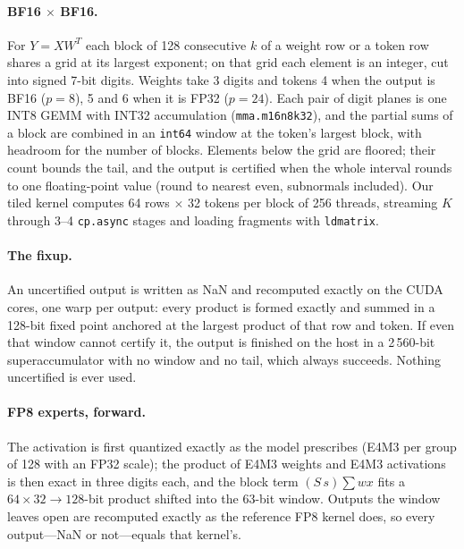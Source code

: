 \documentclass[11pt]{article}
\begin{document}
\paragraph{BF16 $\times$ BF16.} For $Y=XW^{T}$ each block of 128 consecutive $k$ of a weight row or a token row shares a grid at
its largest exponent; on that grid each element is an integer, cut into signed 7-bit digits. Weights take 3 digits and tokens 4
when the output is BF16 ($p=8$), 5 and 6 when it is FP32 ($p=24$). Each pair of digit planes is one INT8 GEMM with INT32
accumulation (\texttt{mma.m16n8k32}), and the partial sums of a block are combined in an \texttt{int64} window at the token's
largest block, with headroom for the number of blocks. Elements below the grid are floored; their count bounds the tail, and
the output is certified when the whole interval rounds to one floating-point value (round to nearest even, subnormals
included). Our tiled kernel computes 64 rows $\times$ 32 tokens per block of 256 threads, streaming $K$ through 3--4
\texttt{cp.async} stages and loading fragments with \texttt{ldmatrix}.

\paragraph{The fixup.} An uncertified output is written as NaN and recomputed exactly on the CUDA cores, one warp per output:
every product is formed exactly and summed in a 128-bit fixed point anchored at the largest product of that row and token. If
even that window cannot certify it, the output is finished on the host in a 2\,560-bit superaccumulator with no window and no
tail, which always succeeds. Nothing uncertified is ever used.

\paragraph{FP8 experts, forward.} The activation is first quantized exactly as the model prescribes (E4M3 per group of 128 with
an FP32 scale); the product of E4M3 weights and E4M3 activations is then exact in three digits each, and the block term
$(S\,s)\sum w x$ fits a $64\times32\to128$-bit product shifted into the 63-bit window. Outputs the window leaves open are
recomputed exactly as the reference FP8 kernel does, so every output---NaN or not---equals that kernel's.
\end{document}
